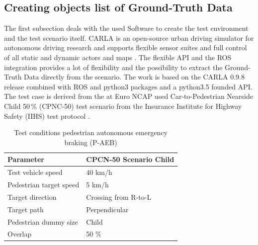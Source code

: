
\subsection{Creating objects list of Ground-Truth Data}
The first subsection deals with the used Software to create the test environment and the test scenario itself. CARLA is an open-source urban driving simulator for autonomous driving research and supports flexible sensor suites and full control of all static and dynamic actors and maps \cite{Dosovitskiy17}. The flexible \ac{API} and the \ac{ROS} integration provides a lot of flexibility and the possibility to extract the Ground-Truth Data directly from the scenario. The work is based on the CARLA 0.9.8 release combined with \ac{ROS} and python3 packages and a python3.5 founded \ac{API}. The test case is derived from the at Euro NCAP used Car-to-Pedestrian Nearside Child 50\,\% (CPNC-50) test scenario from the Insurance Institute for Highway Safety (IIHS) test protocol \cite{NCAP, Protocoll}. %


\begin{table}[h]
	\caption{Test conditions pedestrian autonomous emergency braking (P-AEB) \cite{Protocoll}}
	\label{Test conditions}
	\begin{center}
		\begin{tabular}{l l}
			\hline
			Parameter & CPCN-50 Scenario Child\\
			\hline
			Test vehicle speed & 40 km/h\\
			Pedestrian target speed & 5 km/h\\
			Target direction        & Crossing from R-to-L\\
			Target path             & Perpendicular\\
			Pedestrian dummy size   & Child\\
			Overlap                 & 50 \%\\
			\hline
			
			
		\end{tabular}
	\end{center}
\end{table}



